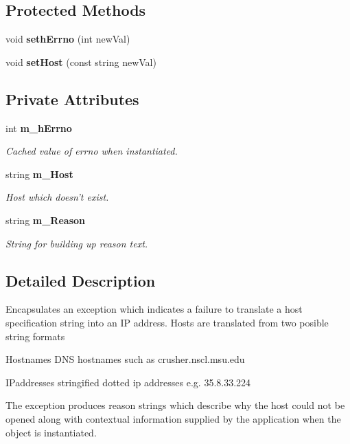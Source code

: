 \subsection*{Protected Methods}
\begin{CompactItemize}
\item 
void {\bf seth\-Errno} (int new\-Val)
\item 
void {\bf set\-Host} (const string new\-Val)
\end{CompactItemize}
\subsection*{Private Attributes}
\begin{CompactItemize}
\item 
int {\bf m\_\-h\-Errno}
\begin{CompactList}\small\item\em Cached value of errno when instantiated.\item\end{CompactList}\item 
string {\bf m\_\-Host}
\begin{CompactList}\small\item\em Host which doesn't exist.\item\end{CompactList}\item 
string {\bf m\_\-Reason}
\begin{CompactList}\small\item\em String for building up reason text.\item\end{CompactList}\end{CompactItemize}


\subsection{Detailed Description}
Encapsulates an exception which indicates a failure to translate a host specification string into an IP address. Hosts are translated from two posible string formats

\begin{CompactItemize}
\item 
Hostnames DNS hostnames such as crusher.nscl.msu.edu\item 
IPaddresses stringified dotted ip addresses e.g. 35.8.33.224\end{CompactItemize}
The exception produces reason strings which describe why the host could not be opened along with contextual information supplied by the application when the object is instantiated. 



